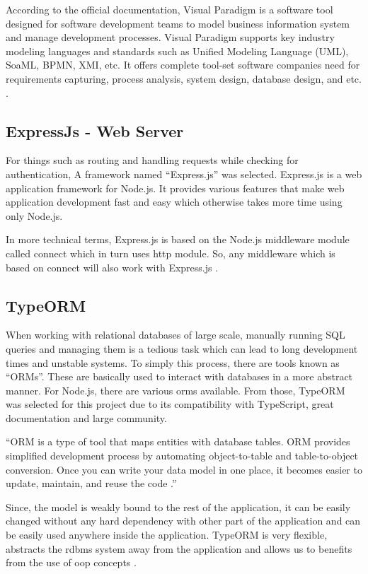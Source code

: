 \documentclass[12pt]{report}
\begin{document}
According to the official documentation, Visual Paradigm is a software tool designed for software development teams to model business information system and manage development processes. Visual Paradigm supports key industry modeling languages and standards such as Unified Modeling Language (UML), SoaML, BPMN, XMI, etc. It offers complete tool-set software companies need for requirements capturing, process analysis, system design, database design, and etc. \cite{vparadigm_2020_introduction}.

\subsection{ExpressJs - Web Server}
For things such as routing and handling requests while checking for authentication, A framework named ``Express.js'' was selected. Express.js is a web application framework for Node.js. It provides various features that make web application development fast and easy which otherwise takes more time using only Node.js.

In more technical terms, Express.js is based on the Node.js middleware module called connect which in turn uses http module. So, any middleware which is based on connect will also work with Express.js \cite{azatmardan_2014_expressjs}.

\subsection{TypeORM}
When working with relational databases of large scale, manually running SQL queries and managing them is a tedious task which can lead to long development times and unstable systems. To simply this process, there are tools known as ``ORMs''. These are basically used to interact with databases in a more abstract manner. For Node.js, there are various \acrshort{orm}s available. From those, TypeORM was selected for this project due to its compatibility with TypeScript, great documentation and large community.

``ORM is a type of tool that maps entities with database tables. ORM provides simplified development process by automating object-to-table and table-to-object conversion. Once you can write your data model in one place, it becomes easier to update, maintain, and reuse the code \cite{tpoint_2020_typeorm}.''

Since, the model is weakly bound to the rest of the application, it can be easily changed without any hard dependency with other part of the application and can be easily used anywhere inside the application. TypeORM is very flexible, abstracts the \acrshort{rdbms} system away from the application and allows us to benefits from the use of \acrshort{oop} concepts \cite{tpoint_2020_typeorm}.
\end{document}
